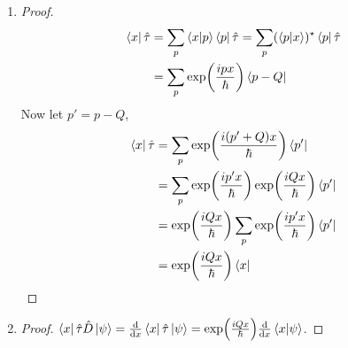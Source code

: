 \begin{enumerate}
  \item[3.4-2] 
    \begin{proof}
      \begin{align*}
        \bra{x} \hat{\tau} &= \sum_p \braket{x}{p} \bra{p} \hat{\tau} = \sum_p (\braket{p}{x})^\star \bra{p} \hat{\tau} \\
        &= \sum_p \exp(\frac{ipx}{\hbar}) \bra{p - Q} 
      \end{align*}
      Now let $p' = p - Q$,
      \begin{align*}
        \bra{x} \hat{\tau} &= \sum_p \exp(\frac{i(p' + Q)x}{\hbar}) \bra{p'} \\
        &= \sum_p \exp(\frac{ip'x}{\hbar}) \exp(\frac{iQx}{\hbar}) \bra{p'} \\
        &= \exp(\frac{iQx}{\hbar}) \sum_p \exp(\frac{ip'x}{\hbar}) \bra{p'} \\
        &= \exp(\frac{iQx}{\hbar}) \bra{x}
      \end{align*}
    \end{proof}
  \item[3.5-1] 
    \begin{proof}
      $\bra{x} \hat{\tau} \hat{D} \ket{\psi} = \dv{x} \bra{x} \hat{\tau} \ket{\psi}
      = \exp(\frac{iQx}{\hbar}) \dv{x} \braket{x}{\psi}$.
    \end{proof}
\end{enumerate}
